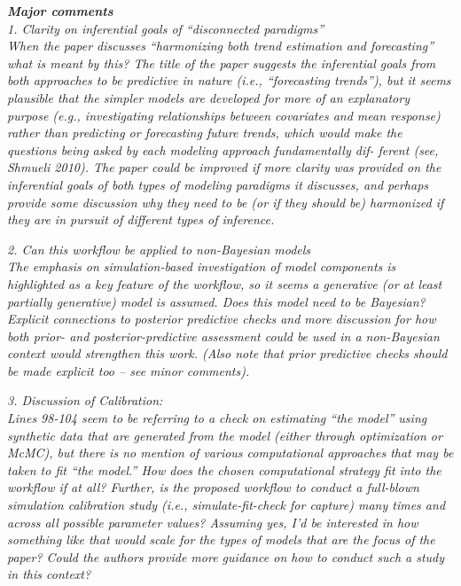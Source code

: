 \documentclass[11pt,letter]{article}
\begin{document}

\begin{mybox}
\emph{\textbf{Major comments}\\
1. Clarity on inferential goals of “disconnected paradigms”\\
 When the paper discusses “harmonizing both trend estimation and forecasting” what is meant by this? The
title of the paper suggests the inferential goals from both approaches to be predictive
in nature (i.e., “forecasting trends”), but it seems plausible that the simpler models are
developed for more of an explanatory purpose (e.g., investigating relationships between
covariates and mean response) rather than predicting or forecasting future trends, which
would make the questions being asked by each modeling approach fundamentally dif-
ferent (see, Shmueli 2010). The paper could be improved if more clarity was provided
on the inferential goals of both types of modeling paradigms it discusses, and perhaps
provide some discussion why they need to be (or if they should be) harmonized if they
are in pursuit of different types of inference.}
\end{mybox}

\begin{mybox}
\emph{2. Can this workflow be applied to non-Bayesian models\\
The emphasis on simulation-based investigation of model components is highlighted as a key feature of
the workflow, so it seems a generative (or at least partially generative) model is assumed. Does this model need to be Bayesian? Explicit connections to posterior predictive checks and more discussion for how both prior- and posterior-predictive assessment could be used in a non-Bayesian context would strengthen this work. (Also note that prior predictive checks should be made explicit too – see minor comments).}
\end{mybox}

\begin{mybox}
\emph{3. Discussion of Calibration:\\
Lines 98-104 seem to be referring to a check on estimating “the model” using synthetic data that are generated from the model (either through optimization or McMC), but there is no mention of various computational approaches that may be taken to fit “the model.” How does the chosen computational strategy fit into the workflow if at all? Further, is the proposed workflow to conduct a full-blown simulation calibration study (i.e., simulate-fit-check for capture) many times and across all possible parameter values? Assuming yes, I’d be interested in how something like that would scale for the types of models that are the focus of the paper? Could the authors provide more guidance on how to conduct such a study in this context?}
\end{mybox}
\end{document}
